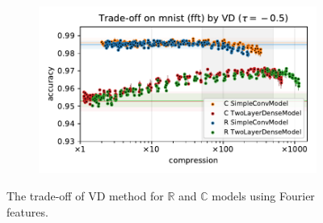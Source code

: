 \documentclass[a4paper,10pt,onecolumn]{article}
\newcommand{\real}{\mathbb{R}}
\newcommand{\cplx}{\mathbb{C}}
\begin{document}
\begin{figure}[b]
\begin{subfigure}[b]{0.5\columnwidth}
  \end{subfigure}%
  \begin{subfigure}[b]{0.5\columnwidth}
    \centering
    \includegraphics[width=\linewidth]{figure__mnist-like__trade-off/appendix__VD__mnist__fft__-0.5.pdf}
  \end{subfigure}
  \caption{%
    The trade-off of VD method for $\real$ and $\cplx$ models using Fourier features.
  }
  \label{fig:appendix__mnist-like__trade-off__VD__fft}
\end{figure}
\end{document}
